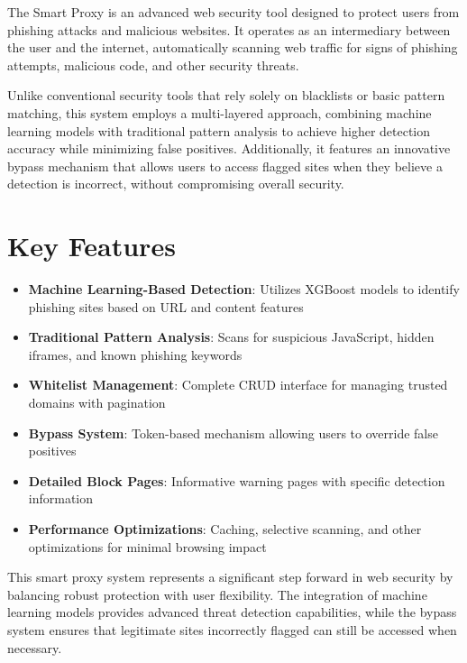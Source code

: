 The Smart Proxy is an advanced web security tool designed to protect users from phishing attacks and malicious websites. It operates as an intermediary between the user and the internet, automatically scanning web traffic for signs of phishing attempts, malicious code, and other security threats.

Unlike conventional security tools that rely solely on blacklists or basic pattern matching, this system employs a multi-layered approach, combining machine learning models with traditional pattern analysis to achieve higher detection accuracy while minimizing false positives. Additionally, it features an innovative bypass mechanism that allows users to access flagged sites when they believe a detection is incorrect, without compromising overall security.

\section*{Key Features}
\begin{itemize}
    \item \textbf{Machine Learning-Based Detection}: Utilizes XGBoost models to identify phishing sites based on URL and content features
    \item \textbf{Traditional Pattern Analysis}: Scans for suspicious JavaScript, hidden iframes, and known phishing keywords
    \item \textbf{Whitelist Management}: Complete CRUD interface for managing trusted domains with pagination
    \item \textbf{Bypass System}: Token-based mechanism allowing users to override false positives
    \item \textbf{Detailed Block Pages}: Informative warning pages with specific detection information
    \item \textbf{Performance Optimizations}: Caching, selective scanning, and other optimizations for minimal browsing impact
\end{itemize}

This smart proxy system represents a significant step forward in web security by balancing robust protection with user flexibility. The integration of machine learning models provides advanced threat detection capabilities, while the bypass system ensures that legitimate sites incorrectly flagged can still be accessed when necessary.
